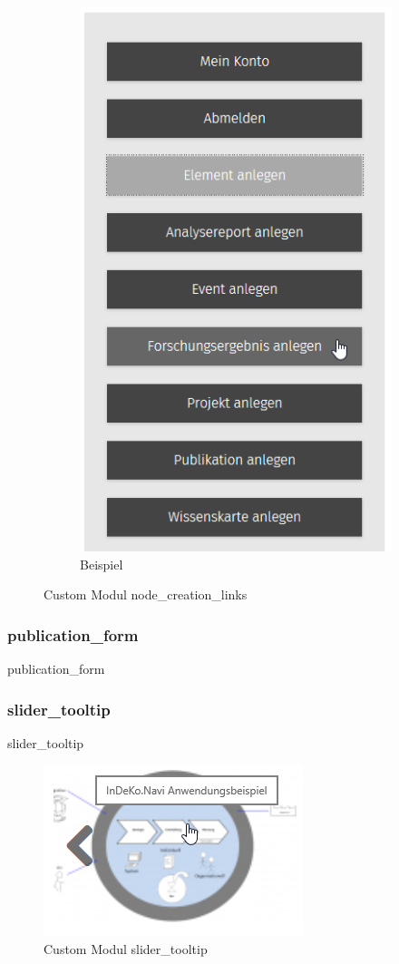\begin{figure}[H]
\begin{subfigure}[A]{0.4\textwidth}
		\includegraphics[height=0.20\textheight]{images/example_nodecreationlinks}
		\caption[]{Beispiel}
		\label{fig:example_nodecreationlinks}
	\end{subfigure}
	\caption{Custom Modul node\_creation\_links}
	\label{fig:nodecreationlinks}
\end{figure}



\subsubsection{publication\_form}\label{subsub:publicationform}
publication\_form


\subsubsection{slider\_tooltip}\label{subsub:slidertooltip}
slider\_tooltip
\begin{figure}[H]
	\centering
	\includegraphics[height=0.10\textheight]{images/example_slidertooltip}
	\caption{Custom Modul slider\_tooltip}
	\label{fig:example_slidertooltip}
\end{figure}


